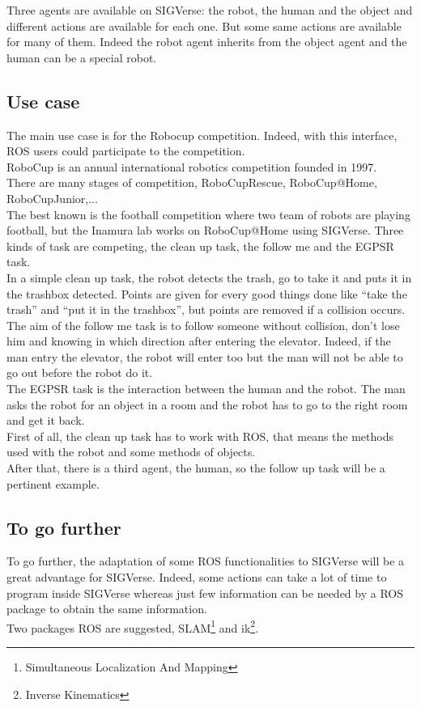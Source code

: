 Three agents are available on SIGVerse: the robot, the human and the object and different actions are available for each one. But some same actions are available for many of them. Indeed the robot agent inherits from the object agent and the human can be a special robot.

\subsection{Use case}
The main use case is for the Robocup competition. Indeed, with this interface, ROS users could participate to the competition.\\
RoboCup is an annual international robotics competition founded in 1997.\\
There are many stages of competition, RoboCupRescue, RoboCup@Home, RoboCupJunior,...\\
The best known is the football competition where two team of robots are playing football, but the Inamura lab works on RoboCup@Home using SIGVerse. Three kinds of task are competing, the clean up task, the follow me and the EGPSR task.\\
In a simple clean up task, the robot detects the trash, go to take it and puts it in the trashbox detected. Points are given for every good things done like ``take the trash'' and ``put it in the trashbox'', but points are removed if a collision occurs.\\
The aim of the follow me task is to follow someone without collision, don't lose him and knowing in which direction after entering the elevator. Indeed, if the man entry the elevator, the robot will enter too but the man will not be able to go out before the robot do it.\\
The EGPSR task is the interaction between the human and the robot. The man asks the robot for an object in a room and the robot has to go to the right room and get it back.\\
First of all, the clean up task has to work with ROS, that means the methods used with the robot and some methods of objects.\\
After that, there is a third agent, the human, so the follow up task will be a pertinent example.

\subsection{To go further}
To go further, the adaptation of some ROS functionalities to SIGVerse will be a great advantage for SIGVerse. Indeed, some actions can take a lot of time to program inside SIGVerse whereas just few information can be needed by a ROS package to obtain the same information.\\
Two packages ROS are suggested, SLAM\footnote{Simultaneous Localization And Mapping} and ik\footnote{Inverse Kinematics}.


